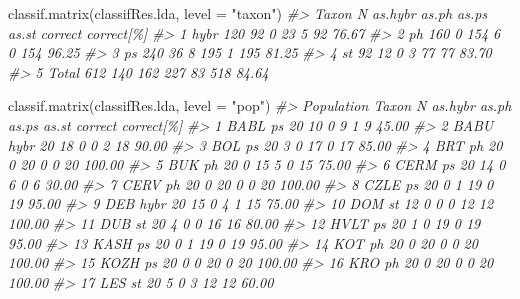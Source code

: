 \documentclass[
  11pt,
  a4paper]{article}
\newenvironment{Shaded}{\begin{snugshade}}{\end{snugshade}}
\newcommand{\AttributeTok}[1]{\textcolor[rgb]{0.77,0.63,0.00}{#1}}
\newcommand{\CommentTok}[1]{\textcolor[rgb]{0.56,0.35,0.01}{\textit{#1}}}
\newcommand{\FunctionTok}[1]{\textcolor[rgb]{0.00,0.00,0.00}{#1}}
\newcommand{\NormalTok}[1]{#1}
\newcommand{\StringTok}[1]{\textcolor[rgb]{0.31,0.60,0.02}{#1}}
\begin{document}
\begin{Shaded}
\begin{Highlighting}[]
\FunctionTok{classif.matrix}\NormalTok{(classifRes.lda, }\AttributeTok{level =} \StringTok{"taxon"}\NormalTok{)}
\CommentTok{\#\textgreater{}   Taxon   N as.hybr as.ph as.ps as.st correct correct[\%]}
\CommentTok{\#\textgreater{} 1  hybr 120      92     0    23     5      92      76.67}
\CommentTok{\#\textgreater{} 2    ph 160       0   154     6     0     154      96.25}
\CommentTok{\#\textgreater{} 3    ps 240      36     8   195     1     195      81.25}
\CommentTok{\#\textgreater{} 4    st  92      12     0     3    77      77      83.70}
\CommentTok{\#\textgreater{} 5 Total 612     140   162   227    83     518      84.64}

\FunctionTok{classif.matrix}\NormalTok{(classifRes.lda, }\AttributeTok{level =} \StringTok{"pop"}\NormalTok{)}
\CommentTok{\#\textgreater{}    Population Taxon   N as.hybr as.ph as.ps as.st correct correct[\%]}
\CommentTok{\#\textgreater{} 1        BABL    ps  20      10     0     9     1       9      45.00}
\CommentTok{\#\textgreater{} 2        BABU  hybr  20      18     0     0     2      18      90.00}
\CommentTok{\#\textgreater{} 3         BOL    ps  20       3     0    17     0      17      85.00}
\CommentTok{\#\textgreater{} 4         BRT    ph  20       0    20     0     0      20     100.00}
\CommentTok{\#\textgreater{} 5         BUK    ph  20       0    15     5     0      15      75.00}
\CommentTok{\#\textgreater{} 6        CERM    ps  20      14     0     6     0       6      30.00}
\CommentTok{\#\textgreater{} 7        CERV    ph  20       0    20     0     0      20     100.00}
\CommentTok{\#\textgreater{} 8        CZLE    ps  20       0     1    19     0      19      95.00}
\CommentTok{\#\textgreater{} 9         DEB  hybr  20      15     0     4     1      15      75.00}
\CommentTok{\#\textgreater{} 10        DOM    st  12       0     0     0    12      12     100.00}
\CommentTok{\#\textgreater{} 11        DUB    st  20       4     0     0    16      16      80.00}
\CommentTok{\#\textgreater{} 12       HVLT    ps  20       1     0    19     0      19      95.00}
\CommentTok{\#\textgreater{} 13       KASH    ps  20       0     1    19     0      19      95.00}
\CommentTok{\#\textgreater{} 14        KOT    ph  20       0    20     0     0      20     100.00}
\CommentTok{\#\textgreater{} 15       KOZH    ps  20       0     0    20     0      20     100.00}
\CommentTok{\#\textgreater{} 16        KRO    ph  20       0    20     0     0      20     100.00}
\CommentTok{\#\textgreater{} 17        LES    st  20       5     0     3    12      12      60.00}

\end{Highlighting}
\end{Shaded}
\end{document}

